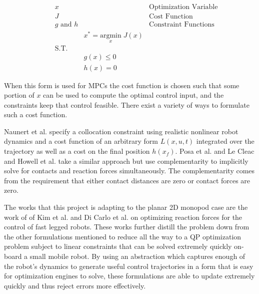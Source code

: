 \documentclass[conference]{IEEEtran}
\begin{document}
\begin{align*}
    \quad & x                &                                           & \text{Optimization Variable} \\
          & J                &                                           & \text{Cost Function}         \\
          & g \text{ and } h &                                           & \text{Constraint Functions}  \\
          &                  & x^* = \underset{x}{\text{argmin}} \; J(x)                                \\
          & \text{S.T.}      &                                                                          \\
          &                  & g(x) \leq 0                                                              \\
          &                  & h(x) = 0
\end{align*}

When this form is used for MPCs the cost function is chosen such that some portion of \(x\) can be used to compute the optimal control input, and the constraints keep that control feasible.
There exist a variety of ways to formulate such a cost function.

Naunert et al. \cite{neunert_whole-body_2018} specify a collocation constraint using realistic nonlinear robot dynamics and a cost function of an arbitrary form \(L(x, u, t)\) integrated over the trajectory as well as a cost on the final position \(h(x_f)\).
Posa et al. \cite{posa_direct_2014} and Le Cleac and Howell et al. \cite{cleach_fast_2023} take a similar approach but use complementarity to implicitly solve for contacts and reaction forces simultaneously.
The complementarity comes from the requirement that either contact distances are zero or contact forces are zero.

The works that this project is adapting to the planar 2D monopod case are the work of of Kim et al. \cite{kim_highly_2019} and Di Carlo et al. \cite{di_carlo_dynamic_2018} on optimizing reaction forces for the control of fast legged robots.
These works further distill the problem down from the other formulations mentioned to reduce all the way to a QP optimization problem subject to linear constraints that can be solved extremely quickly on-board a small mobile robot.
By using an abstraction which captures enough of the robot's dynamics to generate useful control trajectories in a form that is easy for optimization engines to solve, these formulations are able to update extremely quickly and thus reject errors more effectively.
\end{document}
